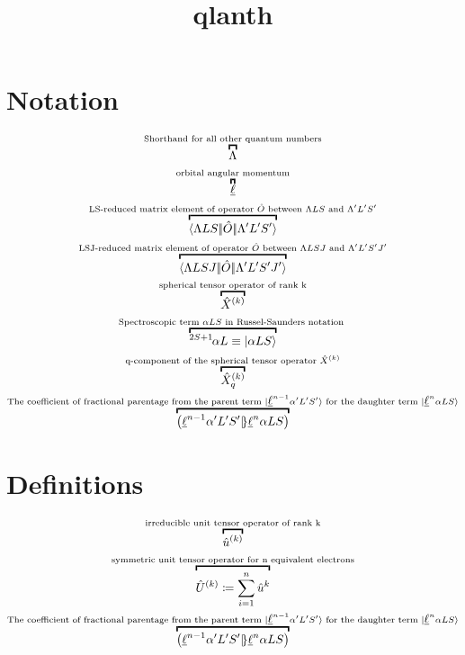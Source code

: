 \documentclass{article}
\begin{document}
\title{qlanth}
\author{}
\date{}
\maketitle

\section{Notation}

\begin{gather}
    \overbracket{\Lambda}^{\text{Shorthand for all other quantum numbers}} \\ 
    \overbracket{\lorb}^{\text{orbital angular momentum}} \\
    \overbracket{\redbraopket{\Lambda LS}{\op{O}}{\Lambda' L'S'}}^{\text{LS-reduced matrix element of operator }\hat{O}\text{ between }{\Lambda LS} \text{ and } {\Lambda' L'S'}} \\
    \overbracket{\redbraopket{\Lambda LSJ}{\op{O}}{\Lambda' L'S'J'}}^{\text{LSJ-reduced matrix element of operator }\hat{O}\text{ between }{\Lambda LSJ} \text{ and } {\Lambda' L'S'J'}} \\
    \overbracket{\op{X}^{(k)}}^{\text{spherical tensor operator of rank k}} \\
    \overbracket{\LSterm{2 S + 1}{\alpha{L}}\equiv \ket{\alpha{LS}}}^{\text{Spectroscopic term } {\alpha{LS}} \text{ in Russel-Saunders notation }} \\
    \overbracket{\op{X}_q^{(k)}}^{\text{q-component of the spherical tensor operator }\op{X}^{(k)}} \\
    \overbracket{\cfp{\lorb^{n-1}\alpha'L'S'}{\lorb^n\alpha{L}{S}}}^{\text{The coefficient of fractional parentage from the parent term }\ket{\lorb^{n-1}\alpha'{L'S'}}\text{ for the daughter term }\ket{\lorb^{n}\alpha{LS}}}  
\end{gather}

\section{Definitions}

\begin{gather}
    \overbracket{\op{u}^{(k)}}^{\text{irreducible unit tensor operator of rank k}} \\
    \overbracket{\op{U}^{(k)} \DEF \sum_{i=1}^{n} \op{u}^{k} }^{\text{symmetric unit tensor operator for n equivalent electrons}} \\
    \overbracket{\cfp{\lorb^{n-1}\alpha'L'S'}{\lorb^n\alpha{L}{S}}}^{\text{The coefficient of fractional parentage from the parent term }\ket{\lorb^{n-1}\alpha'{L'S'}}\text{ for the daughter term }\ket{\lorb^{n}\alpha{LS}}}
\end{gather}
\end{document}
